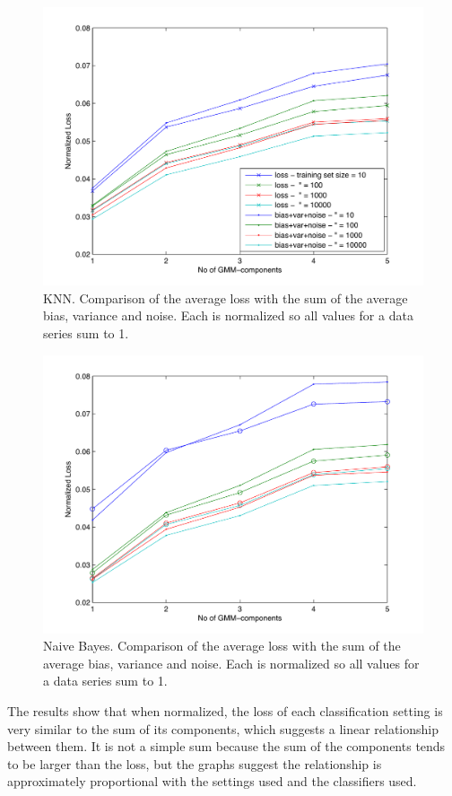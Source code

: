 \documentclass[a4paper]{article}
\begin{document}
\begin{figure}[htb]
    \centering
    \includegraphics[width=.9\textwidth]{5040_knn_losscomp.pdf}
    \caption{KNN. Comparison of the average loss with the sum of the average bias, variance and noise. Each is normalized so all values for a data series sum to 1. \label{fig:knnlosscomp}}
\end{figure}

\begin{figure}[htb]
    \centering
    \includegraphics[width=.9\textwidth]{5050_nb_losscomp.pdf}
    \caption{Naive Bayes. Comparison of the average loss with the sum of the average bias, variance and noise. Each is normalized so all values for a data series sum to 1. \label{fig:nblosscomp}}
\end{figure}

The results show that when normalized, the loss of each classification setting is very similar to the sum of its components, which suggests a linear relationship between them. It is not a simple sum because the sum of the components tends to be larger than the loss, but the graphs suggest the relationship is approximately proportional with the settings used and the classifiers used.
\end{document}

